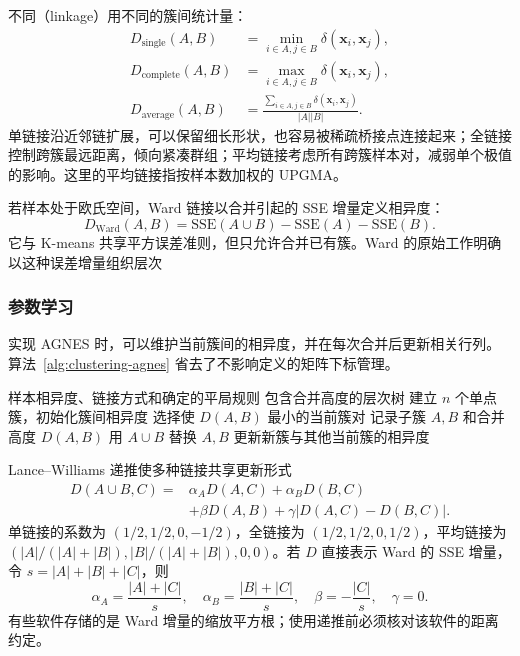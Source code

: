 不同（linkage）用不同的簇间统计量：
\begin{align*}
 D_{\mathrm{single}}(A,B)
   &=\min_{i\in A,j\in B}\delta(\bm{x}_i,\bm{x}_j),\\
 D_{\mathrm{complete}}(A,B)
   &=\max_{i\in A,j\in B}\delta(\bm{x}_i,\bm{x}_j),\\
 D_{\mathrm{average}}(A,B)
   &=\frac{\sum_{i\in A,j\in B}\delta(\bm{x}_i,\bm{x}_j)}
   {|A||B|}.
\end{align*}
单链接沿近邻链扩展，可以保留细长形状，也容易被稀疏桥接点连接起来；全链接控制跨簇最远距离，倾向紧凑群组；平均链接考虑所有跨簇样本对，减弱单个极值的影响。这里的平均链接指按样本数加权的 UPGMA。

若样本处于欧氏空间，Ward 链接以合并引起的 SSE 增量定义相异度：
\[
 D_{\mathrm{Ward}}(A,B)
 =\mathrm{SSE}(A\cup B)-\mathrm{SSE}(A)-\mathrm{SSE}(B).
\]
它与 K-means 共享平方误差准则，但只允许合并已有簇。Ward 的原始工作明确以这种误差增量组织层次

\subsubsection{参数学习}

实现 AGNES 时，可以维护当前簇间的相异度，并在每次合并后更新相关行列。算法~\ref{alg:clustering-agnes} 省去了不影响定义的矩阵下标管理。

\begin{algorithm}[凝聚层次聚类]
 \label{alg:clustering-agnes}
 \begin{algorithmic}[1]
 \Require 样本相异度、链接方式和确定的平局规则
 \Ensure 包含合并高度的层次树
 \State 建立 $n$ 个单点簇，初始化簇间相异度
  \State 选择使 $D(A,B)$ 最小的当前簇对
  \State 记录子簇 $A,B$ 和合并高度 $D(A,B)$
  \State 用 $A\cup B$ 替换 $A,B$
  \State 更新新簇与其他当前簇的相异度
 \EndWhile
 \end{algorithmic}
\end{algorithm}

Lance--Williams 递推使多种链接共享更新形式
\begin{equation}
 \begin{aligned}
 D(A\cup B,C)={}&\alpha_A D(A,C)+\alpha_B D(B,C)\\
 &+\beta D(A,B)
 +\gamma|D(A,C)-D(B,C)|.
 \end{aligned}
 \label{eq:clustering-lance-williams}
\end{equation}
单链接的系数为 $(1/2,1/2,0,-1/2)$，全链接为 $(1/2,1/2,0,1/2)$，平均链接为 $(|A|/(|A|+|B|),|B|/(|A|+|B|),0,0)$。若 $D$ 直接表示 Ward 的 SSE 增量，令 $s=|A|+|B|+|C|$，则
\[
 \alpha_A=\frac{|A|+|C|}{s},\quad
 \alpha_B=\frac{|B|+|C|}{s},\quad
 \beta=-\frac{|C|}{s},\quad \gamma=0.
\]
有些软件存储的是 Ward 增量的缩放平方根；使用递推前必须核对该软件的距离约定。

